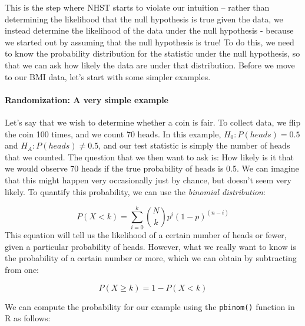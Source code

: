 \documentclass[]{book}
\newenvironment{Shaded}{\begin{snugshade}}{\end{snugshade}}
\newcommand{\KeywordTok}[1]{\textcolor[rgb]{0.13,0.29,0.53}{\textbf{#1}}}
\newcommand{\DecValTok}[1]{\textcolor[rgb]{0.00,0.00,0.81}{#1}}
\newcommand{\FloatTok}[1]{\textcolor[rgb]{0.00,0.00,0.81}{#1}}
\newcommand{\StringTok}[1]{\textcolor[rgb]{0.31,0.60,0.02}{#1}}
\newcommand{\CommentTok}[1]{\textcolor[rgb]{0.56,0.35,0.01}{\textit{#1}}}
\newcommand{\NormalTok}[1]{#1}
\let\oldparagraph\paragraph
\renewcommand{\paragraph}[1]{\oldparagraph{#1}\mbox{}}
\theoremstyle{definition}
\theoremstyle{definition}
\theoremstyle{definition}
\theoremstyle{remark}
\begin{document}
This is the step where NHST starts to violate our intuition -- rather
than determining the likelihood that the null hypothesis is true given
the data, we instead determine the likelihood of the data under the null
hypothesis - because we started out by assuming that the null hypothesis
is true! To do this, we need to know the probability distribution for
the statistic under the null hypothesis, so that we can ask how likely
the data are under that distribution. Before we move to our BMI data,
let's start with some simpler examples.

\paragraph{Randomization: A very simple
example}\label{randomization-a-very-simple-example}

Let's say that we wish to determine whether a coin is fair. To collect
data, we flip the coin 100 times, and we count 70 heads. In this
example, \(H_0: P(heads)=0.5\) and \(H_A: P(heads) \neq 0.5\), and our
test statistic is simply the number of heads that we counted. The
question that we then want to ask is: How likely is it that we would
observe 70 heads if the true probability of heads is 0.5. We can imagine
that this might happen very occasionally just by chance, but doesn't
seem very likely. To quantify this probability, we can use the
\emph{binomial distribution}:

\[
P(X < k) = \sum_{i=0}^k \binom{N}{k} p^i (1-p)^{(n-i)}
\] This equation will tell us the likelihood of a certain number of
heads or fewer, given a particular probability of heads. However, what
we really want to know is the probability of a certain number or more,
which we can obtain by subtracting from one:

\[
P(X \ge k) = 1 - P(X < k)
\]

We can compute the probability for our example using the
\texttt{pbinom()} function in R as follows:

\begin{Shaded}
\end{Shaded}
\end{document}
